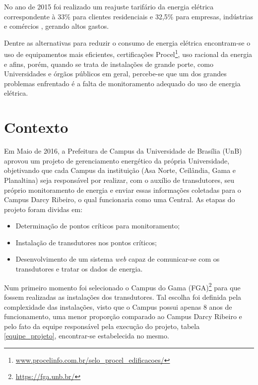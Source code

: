 No ano de 2015 foi realizado um reajuste tarifário da energia elétrica correspondente à 33\% para clientes residenciais e 32,5\% para empresas, indústrias e comércios \cite{aumento_energia}, gerando altos gastos.

Dentre as alternativas para reduzir o consumo de energia elétrica encontram-se o uso de equipamentos mais eficientes, certificações Procel\footnote{\url{www.procelinfo.com.br/selo_procel_edificacoes/}}, uso racional da energia e afins, porém, quando se trata de instalações de grande porte, como Universidades e órgãos públicos em geral, percebe-se que um dos grandes problemas enfrentado é a falta de monitoramento adequado do uso de energia elétrica.

\section{Contexto}
Em Maio de 2016, a Prefeitura de Campus da Universidade de Brasília (UnB) aprovou um projeto de gerenciamento energético da própria Universidade, objetivando que cada Campus da instituição (Asa Norte, Ceilândia, Gama e Planaltina) seja responsável por realizar, com o auxílio de transdutores, seu próprio monitoramento de energia e enviar essas informações coletadas para o Campus Darcy Ribeiro, o qual funcionaria como uma Central. As etapas do projeto foram dividas em:
\begin{itemize}
    \item Determinação de pontos críticos para monitoramento;
    \item Instalação de transdutores nos pontos críticos;
    \item Desenvolvimento de um sistema \textit{web} capaz de comunicar-se com os transdutores e tratar os dados de energia.
\end{itemize}

Num primeiro momento foi selecionado o Campus do Gama (FGA)\footnote{\url{https://fga.unb.br/}} para que
fossem realizadas as instalações dos transdutores. Tal escolha foi definida pela complexidade das instalações, visto que o Campus possui apenas 8 anos de funcionamento, uma menor proporção comparado ao Campus Darcy Ribeiro e pelo fato da equipe responsável pela execução do projeto, tabela \ref{equipe_projeto}, encontrar-se estabelecida no mesmo.

